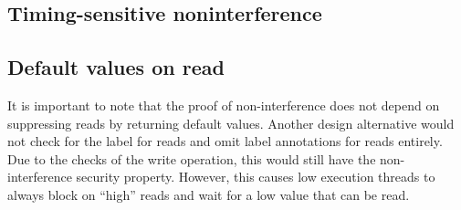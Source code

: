 \documentclass[10pt,preprint]{sigplanconf}
\newcommand{\arrayStretch}{1.28}
\renewcommand{\t}[1]{~\text{#1}~}
\begin{document}





\subsection{Timing-sensitive noninterference}




\subsection{Default values on read}

It is important to note that the proof of non-interference does not depend on suppressing reads by returning default values.  Another design alternative would not check for the label for reads and omit label annotations for reads entirely.  Due to the checks of the write operation, this would still have the non-interference security property.  However, this causes low execution threads to always block on ``high'' reads and wait for a low value that can be read.
\end{document}
